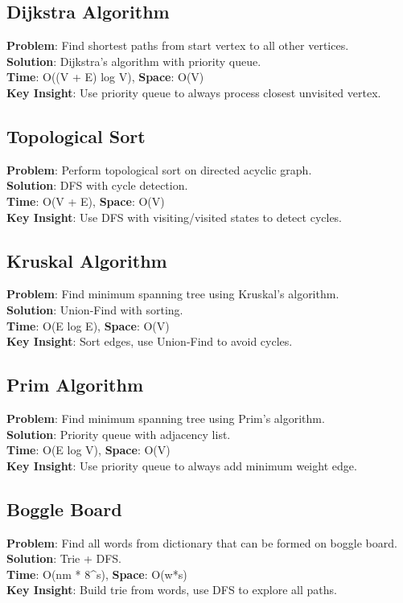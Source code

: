 \documentclass{report}
\begin{document}
\subsection{Dijkstra Algorithm}
\textbf{Problem}: Find shortest paths from start vertex to all other vertices.\\
\textbf{Solution}: Dijkstra's algorithm with priority queue.\\
\textbf{Time}: O((V + E) log V), \textbf{Space}: O(V)\\
\textbf{Key Insight}: Use priority queue to always process closest unvisited vertex.

\subsection{Topological Sort}
\textbf{Problem}: Perform topological sort on directed acyclic graph.\\
\textbf{Solution}: DFS with cycle detection.\\
\textbf{Time}: O(V + E), \textbf{Space}: O(V)\\
\textbf{Key Insight}: Use DFS with visiting/visited states to detect cycles.

\subsection{Kruskal Algorithm}
\textbf{Problem}: Find minimum spanning tree using Kruskal's algorithm.\\
\textbf{Solution}: Union-Find with sorting.\\
\textbf{Time}: O(E log E), \textbf{Space}: O(V)\\
\textbf{Key Insight}: Sort edges, use Union-Find to avoid cycles.

\subsection{Prim Algorithm}
\textbf{Problem}: Find minimum spanning tree using Prim's algorithm.\\
\textbf{Solution}: Priority queue with adjacency list.\\
\textbf{Time}: O(E log V), \textbf{Space}: O(V)\\
\textbf{Key Insight}: Use priority queue to always add minimum weight edge.

\subsection{Boggle Board}
\textbf{Problem}: Find all words from dictionary that can be formed on boggle board.\\
\textbf{Solution}: Trie + DFS.\\
\textbf{Time}: O(nm * 8\textasciicircum s), \textbf{Space}: O(w*s)\\
\textbf{Key Insight}: Build trie from words, use DFS to explore all paths.
\end{document}
